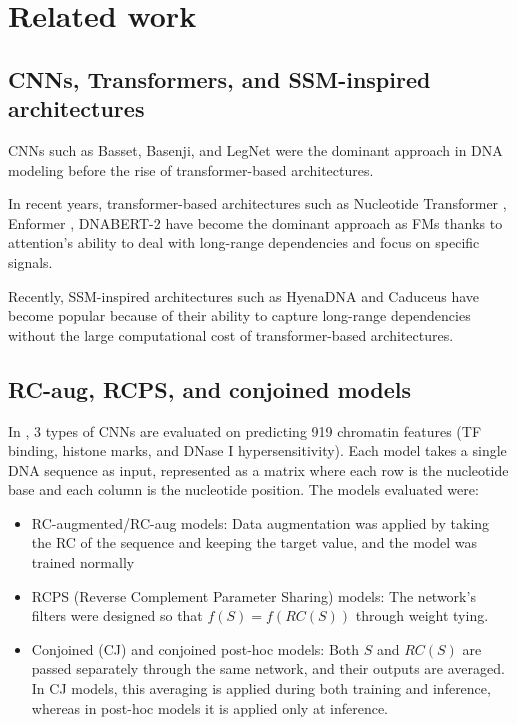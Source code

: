 \documentclass[   ]{article}
\begin{document}
\section{Related work} 

\subsection{CNNs, Transformers, and SSM-inspired architectures}
\label{sec:related_work_transformers_and_ssm}

CNNs such as Basset\citep{kelleyBassetLearningRegulatory2016}, Basenji\citep{kelleySequentialRegulatoryActivity2018}, and LegNet\citep{penzarLegNetBestinclassDeep2023} were the dominant approach in DNA modeling before the rise of transformer-based architectures.

In recent years, transformer-based architectures such as
Nucleotide Transformer
\citep{dalla-torreNucleotideTransformerBuilding2025}, Enformer
\citep{avsecEffectiveGeneExpression2021}, DNABERT-2
\citep{zhouDNABERT2EfficientFoundation2024} have become the
dominant approach as FMs thanks to attention's ability to deal with long-range dependencies and focus on specific signals.

Recently, SSM-inspired architectures such as HyenaDNA
\citep{nguyenHyenaDNALongRangeGenomic2023} and Caduceus
\citep{schiffCaduceusBiDirectionalEquivariant2024} have become popular because of their ability to capture long-range dependencies without the large computational cost of transformer-based architectures.

\subsection{RC-aug, RCPS, and conjoined models}
\label{sec:related_work_zhou}
In \citet{zhouBetterUnderstandingReverseComplement2021}, 3 types of CNNs are evaluated on predicting 919 chromatin features (TF binding, histone marks, and DNase I hypersensitivity). Each model takes a single DNA sequence as input, represented as a matrix where each row is the nucleotide base and each column is the nucleotide position. The models evaluated were:
\begin{itemize}
	\item RC-augmented/RC-aug models: Data augmentation was applied by taking the RC of the sequence and keeping the target
	value, and the model was trained normally
	\item RCPS (Reverse Complement
	Parameter Sharing) models: The network's filters were designed so that
	\(f(S)=f(RC(S))\) through weight tying.
	\item Conjoined (CJ) and conjoined post-hoc models: Both $S$ and $RC(S)$ are passed separately through the same network, and their outputs are averaged. In CJ models, this averaging is applied during both training and inference, whereas in post-hoc models it is applied only at inference.
\end{itemize}
\end{document}
